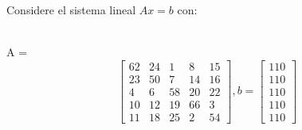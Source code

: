 Considere el sistema lineal $Ax=b$ con:\\\\
\begin{center}
A = 
\[
\begin{bmatrix}
    62 & 24 &  1 &  8 & 15 \\
    23 & 50 &  7 & 14 & 16 \\
     4 &  6 & 58 & 20 & 22 \\
    10 & 12 & 19 & 66 &  3 \\
    11 & 18 & 25 &  2 & 54
\end{bmatrix}
, b = 
\begin{bmatrix}
    110 \\
    110 \\
    110 \\
    110 \\
    110
\end{bmatrix}
\]
\end{center}

